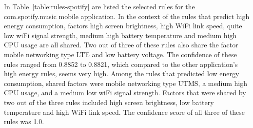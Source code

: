 In Table~\ref{table:rules-spotify} are listed the selected rules for the com.spotify.music mobile application. In the context of the rules that predict high energy consumption, factors high screen brightness, high WiFi link speed, quite low wiFi signal strength, medium high battery temperature and medium high CPU usage are all shared. Two out of three of these rules also share the factor mobile networking type LTE and low battery voltage. The confidence of these rules ranged from 0.8852 to 0.8821, which compared to the other application's high energy rules, seems very high. Among the rules that predicted low energy consumption, shared factors were mobile networking type UTMS, a medium high CPU usage, and a medium low wiFi signal strength. Factors that were shared by two out of the three rules included high screen brightness, low battery temperature and high WiFi link speed. The confidence score of all three of these rules was 1.0. 

